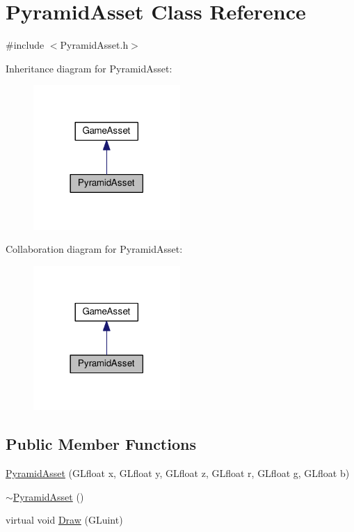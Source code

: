 \hypertarget{class_pyramid_asset}{}\section{Pyramid\+Asset Class Reference}
\label{class_pyramid_asset}


{\ttfamily \#include $<$Pyramid\+Asset.\+h$>$}



Inheritance diagram for Pyramid\+Asset\+:\nopagebreak
\begin{figure}[H]
\begin{center}
\leavevmode
\includegraphics[width=158pt]{class_pyramid_asset__inherit__graph}
\end{center}
\end{figure}


Collaboration diagram for Pyramid\+Asset\+:\nopagebreak
\begin{figure}[H]
\begin{center}
\leavevmode
\includegraphics[width=158pt]{class_pyramid_asset__coll__graph}
\end{center}
\end{figure}
\subsection*{Public Member Functions}
\begin{DoxyCompactItemize}
\item 
\hyperlink{class_pyramid_asset_a7ee5d5547c6b6b3595af4ee512b75ba0}{Pyramid\+Asset} (G\+Lfloat x, G\+Lfloat y, G\+Lfloat z, G\+Lfloat r, G\+Lfloat g, G\+Lfloat b)
\item 
\hyperlink{class_pyramid_asset_afb388a196f43a3808b2d4f6fdb89ee84}{$\sim$\+Pyramid\+Asset} ()
\item 
virtual void \hyperlink{class_pyramid_asset_aaea45da4956d79ec9ab96e9d0ccef3fe}{Draw} (G\+Luint)
\end{DoxyCompactItemize}
